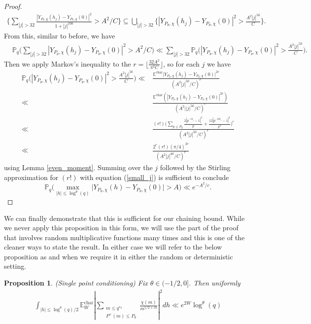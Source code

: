 \documentclass[reqno]{amsart}
\newtheorem{proposition}{Proposition}[section]
\theoremstyle{definition}
\theoremstyle{remark}
\numberwithin{equation}{section}
\theoremstyle{remark}
\begin{document}
\begin{proof}
    \begin{align*}
        \big\{ \sum_{|j| > 32}\frac{|Y_{P_\theta,\chi}(h_j)-Y_{P_\theta,\chi}(0)|^2}{1+|j|^{100}} > A^2/C\big\} \subseteq \bigcup_{|j| > 32}\big\{|Y_{P_\theta,\chi}(h_j)-Y_{P_\theta,\chi}(0)|^2 > \frac{A^2|j|^{50}}{C}\big\}.
    \end{align*}
    From this, similar to before, we have
    \begin{align*}
        &\mathbb{P}_q\big(\sum_{|j| > 32}|Y_{P_\theta,\chi}(h_j)-Y_{P_\theta,\chi}(0)|^2 > A^2/C\big) \ll \sum_{|j| > 32}\mathbb{P}_q\big(|Y_{P_\theta,\chi}(h_j)-Y_{P_\theta,\chi}(0)|^2 > \frac{A^2|j|^{50}}{C}\big).
    \end{align*}
    Then we apply Markov's inequality to the $r=\lfloor\frac{32A^2}{\pi^2C}\rfloor$, so for each $j$ we have
    \begin{align*}
        \mathbb{P}_q\big(|Y_{P_\theta,\chi}(h_j)-Y_{P_\theta,\chi}(0)|^2 > \frac{A^2|j|^{50}}{C}\big) \ll& \frac{\mathbb{E}^{\text{char}}\big|Y_{P_\theta,\chi}(h_j)-Y_{P_\theta,\chi}(0)\big|^{2r}}{(A^2|j|^{50}/C)^r} \\
        \ll& \frac{\mathbb{E}^{\text{char}}(|Y_{P_\theta,\chi}(h_j)-Y_{P_\theta,\chi}(0)|^{2r})}{(A^2||j|^{50}/C)^{r}} \\ \ll& \frac{(r!)\big(\sum_{p \leq P_\theta}\frac{2|p^{-ih_j}-1|^2}{p}+\frac{12|p^{-2ih_j}-1|^2}{p^2}\big)^r}{(A^2|j|^{50}/C)^r} \\
        \ll& \frac{2^r(r!)(\pi/4)^{2r}}{(A^2|j|^{40}/C)^{r}}
    \end{align*}
    using Lemma \ref{even_moment}. Summing over the $j$ followed by the Stirling approximation for $(r!)$ with equation (\ref{small_j}) is sufficient to conclude
    $$\mathbb{P}_q\big(\max_{|h| \leq \log^{\theta}(q)}\big|Y_{P_\theta,\chi}(h)-Y_{P_\theta,\chi}(0) \big| > A\big) \ll e^{-A^2/c}.$$
\end{proof}
We can finally demonstrate that this is sufficient for our chaining bound. While we never apply this proposition in this form, we will use the part of the proof that involves random multiplicative functions many times and this is one of the cleaner ways to state the result. In either case we will refer to the below proposition as and when we require it in either the random or deterministic setting.
\begin{proposition}
    (Single point conditioning) Fix $\theta \in (-1/2,0]$. Then uniformly
    \begin{align*}
        \int_{|h| \leq \log^\theta(q)/2}\mathbb{E}_W^{\text{char}}|\sum_{\substack{m \leq q^{\varepsilon_\theta} \\ P^+(m) \leq P_\theta}}\frac{\chi(m)}{m^{1/2+ih}}|^2dh \ll e^{2W}\log^{\theta}(q)
    \end{align*} \label{chaining}
\end{proposition}
\end{document}
